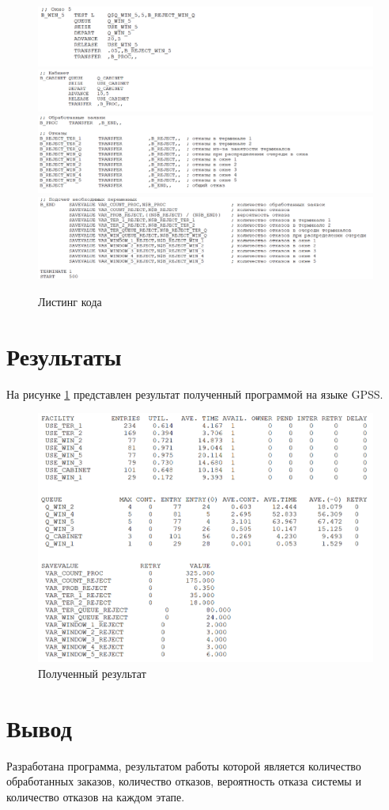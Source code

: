 \begin{figure}[H]
    \centering
    \includegraphics[width=1\textwidth]{img/content/code_7.png}
    \includegraphics[width=1\textwidth]{img/content/code_8.png}
    \includegraphics[width=1\textwidth]{img/content/code_9.png}
    \includegraphics[width=1\textwidth]{img/content/code_10.png}
    \caption{Листинг кода}
\end{figure}

\section{Результаты}

На рисунке \ref{fig:result} представлен результат полученный программой на языке GPSS.

\begin{figure}[H]
    \centering
    \includegraphics[width=1\textwidth]{img/content/result.png}
    \caption{Полученный результат}
    \label{fig:result}
\end{figure}

\section{Вывод}

Разработана программа, результатом работы которой является количество обработанных заказов, количество отказов, вероятность отказа системы и количество отказов на каждом этапе.
